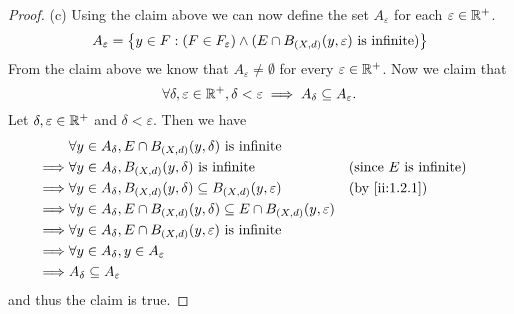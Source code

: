 \begin{proof}{(c)}
  Using the claim above we can now define the set \(A_\varepsilon\) for each \(\varepsilon \in \mathbb{R}^+\).
  \[
    A_\varepsilon = \left\lbrace y \in F : (F \in F_\varepsilon) \land (E \cap B_{(X, d)}(y, \varepsilon) \text{ is infinite})\right\rbrace
  \]
  From the claim above we know that \(A_\varepsilon \neq \emptyset\) for every \(\varepsilon \in \mathbb{R}^+\).
  Now we claim that
  \[
    \forall \delta, \varepsilon \in \mathbb{R}^+, \delta < \varepsilon \implies A_\delta \subseteq A_\varepsilon.
  \]
  Let \(\delta, \varepsilon \in \mathbb{R}^+\) and \(\delta < \varepsilon\).
  Then we have
  \begin{align*}
             & \forall y \in A_\delta, E \cap B_{(X, d)}(y, \delta) \text{ is infinite}                                                               \\
    \implies & \forall y \in A_\delta, B_{(X, d)}(y, \delta) \text{ is infinite}                                &  & \text{(since \(E\) is infinite)} \\
    \implies & \forall y \in A_\delta, B_{(X, d)}(y, \delta) \subseteq B_{(X, d)}(y, \varepsilon)               &  & \by{ii:1.2.1}                       \\
    \implies & \forall y \in A_\delta, E \cap B_{(X, d)}(y, \delta) \subseteq E \cap B_{(X, d)}(y, \varepsilon)                                       \\
    \implies & \forall y \in A_\delta, E \cap B_{(X, d)}(y, \varepsilon) \text{ is infinite}                                                          \\
    \implies & \forall y \in A_\delta, y \in A_\varepsilon                                                                                            \\
    \implies & A_\delta \subseteq A_\varepsilon
  \end{align*}
  and thus the claim is true.


\end{proof}
